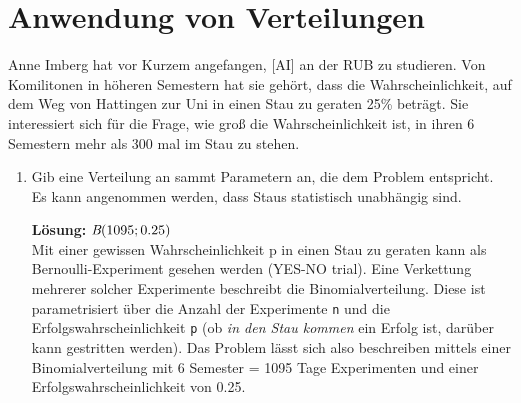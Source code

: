\documentclass[11pt, a4paper]{article}
\begin{document}
\newpage
\section{Anwendung von Verteilungen}
Anne Imberg hat vor Kurzem angefangen, \textcolor{AI-BLUE}{[AI]} an der RUB zu studieren. Von Komilitonen in höheren Semestern hat sie gehört, dass die Wahrscheinlichkeit, auf dem Weg von Hattingen zur Uni in einen Stau zu geraten 25\% beträgt. Sie interessiert sich für die Frage, wie groß die Wahrscheinlichkeit ist, in ihren 6 Semestern mehr als 300 mal im Stau zu stehen.

\begin{enumerate}
	\item Gib eine Verteilung an sammt Parametern an, die dem Problem entspricht. Es kann angenommen werden, dass Staus statistisch unabhängig sind.
	
	\textbf{Lösung:} $\emph{B}(1095;0.25)$ \\
	Mit einer gewissen Wahrscheinlichkeit p in einen Stau zu geraten kann als Bernoulli-Experiment gesehen werden (YES-NO trial). Eine Verkettung mehrerer solcher Experimente beschreibt die Binomialverteilung. Diese ist parametrisiert über die Anzahl der Experimente \texttt{n} und die Erfolgswahrscheinlichkeit \texttt{p} (ob \emph{in den Stau kommen} ein Erfolg ist, darüber kann gestritten werden). Das Problem lässt sich also beschreiben mittels einer Binomialverteilung mit 6 Semester = 1095 Tage Experimenten und einer Erfolgswahrscheinlichkeit von 0.25.
	

\end{enumerate}
\end{document}
